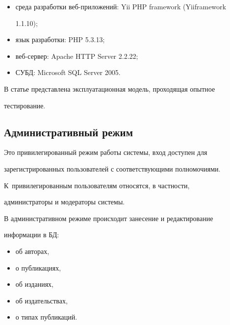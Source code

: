   \begin{itemize}


\item среда разработки веб-приложений: Yii PHP framework (Yiiframework


1.1.10);\\[-15pt]


\item язык разработки: PHP 5.3.13;\\[-15pt]


\item веб-сервер: Apache HTTP Server 2.2.22;\\[-15pt]


\item СУБД: Microsoft SQL Server 2005.


\end{itemize}





  В статье представлена эксплуатационная модель, проходящая опытное


тестирование.











\subsection{Административный режим}











Это привилегированный режим работы системы, вход доступен для


зарегистрированных пользователей с соответствующими полномочиями.


К~привилегированным пользователям относятся, в частности,


администраторы и модераторы системы.





В административном режиме происходит занесение и редактирование


информации в БД:


\begin{itemize}


\item об авторах,


\item о публикациях,


\item об изданиях,


\item об издательствах,


\item о типах публикаций.


\end{itemize}








